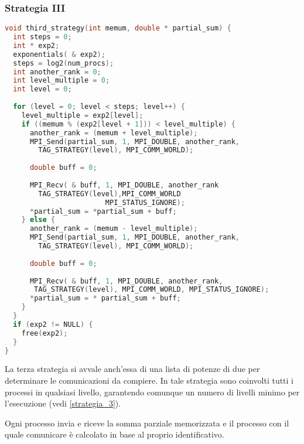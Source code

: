 \documentclass[a4paper,11pt]{book}
\begin{document}
\subsubsection{Strategia III}
\begin{lstlisting}[language=C]
void third_strategy(int memum, double * partial_sum) {
  int steps = 0;
  int * exp2;
  exponentials( & exp2);
  steps = log2(num_procs);
  int another_rank = 0;
  int level_multiple = 0;
  int level = 0;
  
  for (level = 0; level < steps; level++) {
    level_multiple = exp2[level];
    if ((memum % (exp2[level + 1])) < level_multiple) {
      another_rank = (memum + level_multiple);
      MPI_Send(partial_sum, 1, MPI_DOUBLE, another_rank,
        TAG_STRATEGY(level), MPI_COMM_WORLD);
      
      double buff = 0;
      
      MPI_Recv( & buff, 1, MPI_DOUBLE, another_rank
        TAG_STRATEGY(level),MPI_COMM_WORLD   
                        MPI_STATUS_IGNORE);
      *partial_sum = *partial_sum + buff;
    } else {
      another_rank = (memum - level_multiple);
      MPI_Send(partial_sum, 1, MPI_DOUBLE, another_rank,
        TAG_STRATEGY(level), MPI_COMM_WORLD);
      
      double buff = 0;
      
      MPI_Recv( & buff, 1, MPI_DOUBLE, another_rank,
       TAG_STRATEGY(level), MPI_COMM_WORLD, MPI_STATUS_IGNORE);
      *partial_sum = * partial_sum + buff;
    }
  }
  if (exp2 != NULL) {
    free(exp2);
  }
}
\end{lstlisting}
La terza strategia si avvale anch'essa di una lista di potenze di due per determinare le comunicazioni da compiere. In tale strategia sono coinvolti tutti i processi in qualsiasi livello, garantendo comunque un numero di livelli minimo per l'esecuzione (vedi \ref{strategia_3}).\par 
Ogni processo invia e riceve la somma parziale memorizzata e il processo con il quale comunicare  è calcolato in base al proprio identificativo.
\end{document}
